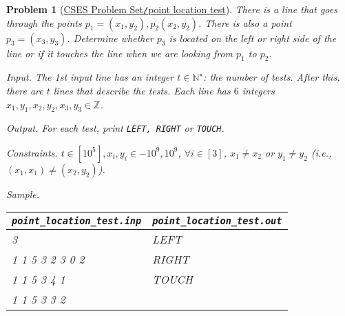\documentclass{article}
\newtheorem{problem}{Problem}
\begin{document}
\begin{problem}[\href{https://cses.fi/problemset/task/2189}{CSES Problem Set{\tt/}point location test}]
    There is a line that goes through the points $p_1 = (x_1,y_2),p_2(x_2,y_2)$. There is also a point $p_3 = (x_3,y_3)$. Determine whether $p_3$ is located on the left or right side of the line or if it touches the line when we are looking from $p_1$ to $p_2$.
    \item {\sf Input.} The 1st input line has an integer $t\in\mathbb{N}^\star$: the number of tests. After this, there are $t$ lines that describe the tests. Each line has $6$ integers $x_1,y_1,x_2,y_2,x_3,y_3\in\mathbb{Z}$.
    \item {\sf Output.} For each test, print {\tt LEFT, RIGHT} or {\tt TOUCH}.
    \item {\sf Constraints.} $t\in[10^5],x_i,y_i\in\overline{-10^9,10^9}$, $\forall i\in[3]$, $x_1\ne x_2$ or $y_1\ne y_2$ (i.e., $(x_1,x_1)\ne(x_2,y_2)$).
    \item {\sf Sample.}
    \begin{table}[H]
        \centering
        \begin{tabular}{|l|l|}
            \hline
            \verb|point_location_test.inp| & \verb|point_location_test.out| \\
            \hline
            3 & LEFT \\
            1 1 5 3 2 3 0 2 & RIGHT \\
            1 1 5 3 4 1 & TOUCH \\
            1 1 5 3 3 2 & \\
            \hline
        \end{tabular}
    \end{table}
\end{problem}
\end{document}

